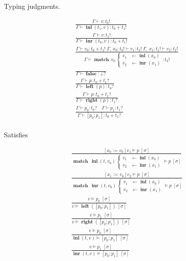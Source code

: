 \documentclass[twocolumn, fleqn]{scrartcl}
\DeclareMathOperator{\inl}{\textbf{inl}}
\DeclareMathOperator{\inr}{\textbf{inr}}
\DeclareMathOperator{\false}{\textbf{false}}
\DeclareMathOperator{\lft}{\textbf{left}}
\DeclareMathOperator{\rgt}{\textbf{right}}
\DeclareMathOperator{\update}{:=}
\DeclareMathOperator{\case}{\textbf{match}}
\begin{document}
Typing judgments.

\begin{multline*}
\frac{
  \Gamma \vdash v \colon t_0 !
}{
  \Gamma \vdash \inl(t_1, v) \colon t_0 + t_1 !
}\\
\frac{
  \Gamma \vdash v \colon t_1 !
}{
  \Gamma \vdash \inr(t_0, v) \colon t_0 + t_1 !
}\\
\frac{
  \Gamma \vdash v_0 \colon t_0 + t_1 ! \;
  \Gamma , \, x_0 \colon t_0 ! \vdash v_1 \colon t_2 ! \;
  \Gamma , \, x_1 \colon t_1 ! \vdash v_2 \colon t_2 !
}{
  \Gamma \vdash
  \case \, v_0 \,
  \begin{cases}
   v_1 & \leftarrow \inl(x_0) \\
   v_2 & \leftarrow \inr(x_1)
  \end{cases}
  \colon t_2 !
}\\
\frac{
}{
  \Gamma \vdash \false \colon \bot ?
}\\
\frac{
  \Gamma \vdash p \colon t_0 + t_1 ?
}{
  \Gamma \vdash \lft(p) \colon t_0 ?
}\\
\frac{
  \Gamma \vdash p \colon t_0 + t_1 ?
}{
  \Gamma \vdash \rgt(p) \colon t_1 ?
}\\
\frac{
  \Gamma \vdash p_0 \colon t_0 ? \quad
  \Gamma \vdash p_1 \colon t_1 ?
}{
  \Gamma \vdash [ p_0 ; p_1 ] \colon t_0 + t_1 ?
}\\
\end{multline*}

Satisfies

\begin{multline*}
\frac{
  [x_0 \update v_0] v_1 \models p \; [\sigma]
}{
  \case \, \inl(t, v_0) \,
  \begin{cases}
    v_1 & \leftarrow \inl(x_0) \\
    v_2 & \leftarrow \inr(x_1)
  \end{cases}
 \models p \; [\sigma]
}\\
\frac{
  [x_1 \update v_0] v_2 \models p \; [\sigma]
}{
  \case \, \inr(t, v_0) \,
  \begin{cases}
    v_1 & \leftarrow \inl(x_0) \\
    v_2 & \leftarrow \inr(x_1)
  \end{cases}
  \models p \; [\sigma]
}\\
\frac{
  v \models p_0 \; [\sigma]
}{
  v \models \lft([ p_0 ; p_1 ]) \; [\sigma]
}\\
\frac{
  v \models p_1 \; [\sigma]
}{
  v \models \rgt([ p_0 ; p_1 ])  \; [\sigma]
}\\
\frac{
  v \models p_0 \; [\sigma]
}{
  \inl(t, v) \models [ p_0 ; p_1 ]  \; [\sigma]
}\\
\frac{
  v \models p_1 \; [\sigma]
}{
  \inr(t, v) \models [ p_0 ; p_1 ]  \; [\sigma]
}\\
\end{multline*}
\end{document}
